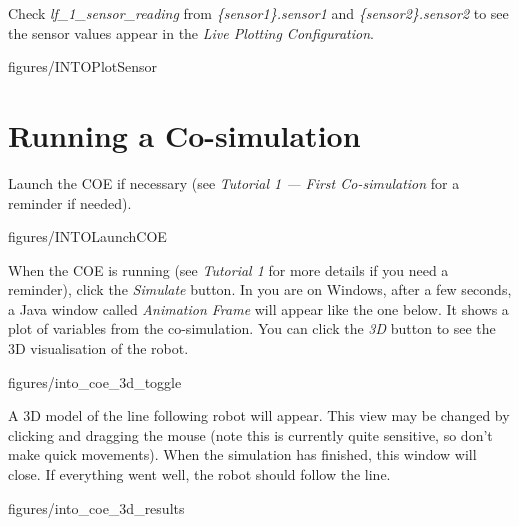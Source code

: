 \documentclass[11pt,a4paper]{../tutorial}
\begin{document}
\begin{instructions}
\item Check \emph{lf\_1\_sensor\_reading} from \emph{\{sensor1\}.sensor1} and \emph{\{sensor2\}.sensor2} to see the sensor values appear in the \emph{Live Plotting Configuration}.

    \begin{annotation}[width=0.85\linewidth,trim=0 230 0 250,clip]{figures/INTOPlotSensor}
    \end{annotation}

\end{instructions}

\section{Running a Co-simulation}

\begin{instructions}

\item Launch the COE if necessary (see \emph{Tutorial 1 --- First Co-simulation} for a reminder if needed).

    \begin{annotation}[width=0.85\linewidth,trim=0 270 0 120,clip]{figures/INTOLaunchCOE}
    \end{annotation}

\item When the COE is running (see \emph{Tutorial 1} for more details if you need a reminder), click the \emph{Simulate} button. In you are on Windows, after a few seconds, a Java window called \emph{Animation Frame} will appear like the one below. It shows a plot of variables from the co-simulation. You can click the \emph{3D} button to see the 3D visualisation of the robot.

    \begin{annotation}[width=0.5\linewidth,trim=0 0 0 0,clip]{figures/into_coe_3d_toggle}
    \end{annotation}

\item  A 3D model of the line following robot will appear. This view may be changed by clicking and dragging the mouse (note this is currently quite sensitive, so don’t make quick movements). When the simulation has finished, this window will close. If everything went well, the robot should follow the line.

    \begin{annotation}[width=0.5\linewidth,trim=0 300 0 0,clip]{figures/into_coe_3d_results}
    \end{annotation}

\end{instructions}
\end{document}
